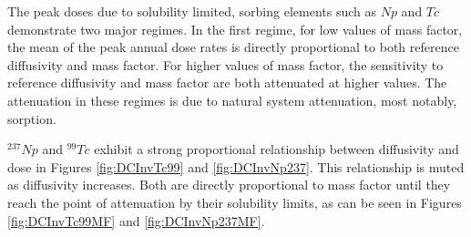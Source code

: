 The peak doses due to solubility limited, sorbing elements such as $Np$ and 
$Tc$ demonstrate two major regimes. In the first regime, for 
low values of mass factor, the mean of the peak annual dose rates is directly 
proportional to both reference diffusivity and mass factor.  For higher values 
of mass factor, the sensitivity to reference diffusivity and mass factor are 
both attenuated at higher values.  The attenuation in these regimes 
is due to natural system attenuation, most notably, sorption.

$^{237}Np$ and $^{99}Tc$ exhibit a strong proportional relationship 
between diffusivity and dose in Figures \ref{fig:DCInvTc99} and 
\ref{fig:DCInvNp237}. This relationship is muted as diffusivity 
increases. Both are directly proportional to mass factor until they reach the 
point of attenuation by their solubility limits, as can be seen in 
Figures \ref{fig:DCInvTc99MF} and \ref{fig:DCInvNp237MF}.

